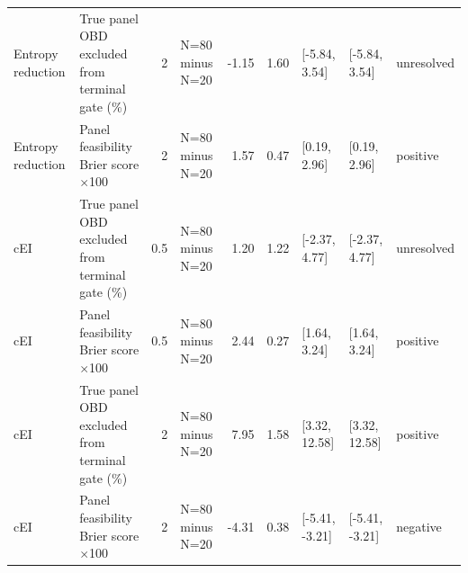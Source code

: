 \begin{longtable}{p{1.8cm}p{3.0cm}rp{2.0cm}rrp{2.6cm}p{2.6cm}p{1.6cm}}
Entropy reduction & True panel OBD excluded from terminal gate (\%) & 2 & N=80 minus N=20 & -1.15 & 1.60 & [-5.84, 3.54] & [-5.84, 3.54] & unresolved \\
Entropy reduction & Panel feasibility Brier score $\times$100 & 2 & N=80 minus N=20 & 1.57 & 0.47 & [0.19, 2.96] & [0.19, 2.96] & positive \\
cEI & True panel OBD excluded from terminal gate (\%) & 0.5 & N=80 minus N=20 & 1.20 & 1.22 & [-2.37, 4.77] & [-2.37, 4.77] & unresolved \\
cEI & Panel feasibility Brier score $\times$100 & 0.5 & N=80 minus N=20 & 2.44 & 0.27 & [1.64, 3.24] & [1.64, 3.24] & positive \\
cEI & True panel OBD excluded from terminal gate (\%) & 2 & N=80 minus N=20 & 7.95 & 1.58 & [3.32, 12.58] & [3.32, 12.58] & positive \\
cEI & Panel feasibility Brier score $\times$100 & 2 & N=80 minus N=20 & -4.31 & 0.38 & [-5.41, -3.21] & [-5.41, -3.21] & negative \\
\bottomrule
\end{longtable}
